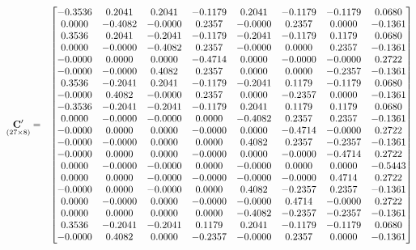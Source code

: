 \documentclass{glimmpse-report}
\begin{document}
\begin{eqnarray*}
\underset{\left(27\times8\right)}{\mathbf{C}'} & = & \begin{bmatrix}-0.3536 & 0.2041 & 0.2041 & -0.1179 & 0.2041 & -0.1179 & -0.1179 & 0.0680\protect\\
0.0000 & -0.4082 & -0.0000 & 0.2357 & -0.0000 & 0.2357 & 0.0000 & -0.1361\protect\\
0.3536 & 0.2041 & -0.2041 & -0.1179 & -0.2041 & -0.1179 & 0.1179 & 0.0680\protect\\
0.0000 & -0.0000 & -0.4082 & 0.2357 & -0.0000 & 0.0000 & 0.2357 & -0.1361\protect\\
-0.0000 & 0.0000 & 0.0000 & -0.4714 & 0.0000 & -0.0000 & -0.0000 & 0.2722\protect\\
-0.0000 & -0.0000 & 0.4082 & 0.2357 & 0.0000 & 0.0000 & -0.2357 & -0.1361\protect\\
0.3536 & -0.2041 & 0.2041 & -0.1179 & -0.2041 & 0.1179 & -0.1179 & 0.0680\protect\\
-0.0000 & 0.4082 & -0.0000 & 0.2357 & 0.0000 & -0.2357 & 0.0000 & -0.1361\protect\\
-0.3536 & -0.2041 & -0.2041 & -0.1179 & 0.2041 & 0.1179 & 0.1179 & 0.0680\protect\\
0.0000 & -0.0000 & -0.0000 & 0.0000 & -0.4082 & 0.2357 & 0.2357 & -0.1361\protect\\
-0.0000 & 0.0000 & 0.0000 & -0.0000 & 0.0000 & -0.4714 & -0.0000 & 0.2722\protect\\
-0.0000 & -0.0000 & 0.0000 & 0.0000 & 0.4082 & 0.2357 & -0.2357 & -0.1361\protect\\
-0.0000 & 0.0000 & 0.0000 & -0.0000 & 0.0000 & -0.0000 & -0.4714 & 0.2722\protect\\
0.0000 & -0.0000 & -0.0000 & 0.0000 & -0.0000 & 0.0000 & 0.0000 & -0.5443\protect\\
0.0000 & 0.0000 & -0.0000 & -0.0000 & -0.0000 & -0.0000 & 0.4714 & 0.2722\protect\\
-0.0000 & 0.0000 & -0.0000 & 0.0000 & 0.4082 & -0.2357 & 0.2357 & -0.1361\protect\\
0.0000 & -0.0000 & 0.0000 & -0.0000 & -0.0000 & 0.4714 & -0.0000 & 0.2722\protect\\
0.0000 & 0.0000 & 0.0000 & 0.0000 & -0.4082 & -0.2357 & -0.2357 & -0.1361\protect\\
0.3536 & -0.2041 & -0.2041 & 0.1179 & 0.2041 & -0.1179 & -0.1179 & 0.0680\protect\\
-0.0000 & 0.4082 & 0.0000 & -0.2357 & -0.0000 & 0.2357 & 0.0000 & -0.1361\protect\\

\end{bmatrix}
\end{eqnarray*}
\end{document}
